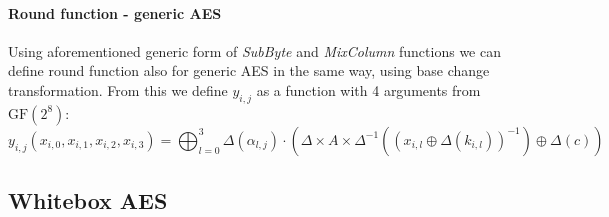 \documentclass[11pt,oneside,final]{fithesis2}
\newcommand{\gfe}{\ensuremath{\text{GF}\left(2^8\right)}}
\begin{document}
	\paragraph*{Round function - generic AES}
	Using aforementioned generic form of \emph{SubByte} and \emph{MixColumn} functions we can define round function also for generic AES in the same way, using base change transformation.
	From this we define $y_{i,j}$ as a function with 4 arguments from $\gfe$:
	\begin{equation}
	y_{i,j}\left(x_{i,0}, x_{i,1}, x_{i,2}, x_{i,3}\right) = \bigoplus^3_{l=0} \Delta(\alpha_{l,j}) \cdot \left( \Delta \times A \times \Delta^{-1} \left( \left(x_{i,l} \oplus \Delta\left(k_{i,l}\right) \right)^{-1} \right) \oplus \Delta \left(c\right) \right)
	\end{equation}

	\subsection{Whitebox AES}
\end{document}
